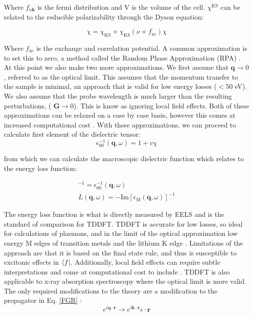 Where $f_{n\textbf{k}}$ is the fermi distribution and V is the volume of the cell.  $\chi^{\mathrm{KS}}$ can be related to the reducible polarizability through the Dyson equation:  

\begin{equation}
\chi = \chi_{\mathrm{KS}} + \chi_{\mathrm{KS}}(\nu + f_{\mathrm{xc}})\chi
\end{equation}

Where $f_{\mathrm{xc}}$ is the exchange and correlation potential.  A common approximation is to set this to zero, a method called the Random Phase Approximation (RPA) \cite{optic}.  At this point we also make two more approximations.  We first assume that $\textbf{q} \to 0$, referred to as the optical limit.  This assumes that the momentum transfer to the sample is minimal, an approach that is valid for low energy losses ($<$50 eV).  We also assume that the probe wavelength is much larger than the resulting perturbations, ($\textbf{ G} \to 0$). This is know as ignoring local field effects.  Both of these approximations can be relaxed on a case by case basis, however this comes at increased computational cost \cite{exciting}. With these approximations, we can proceed to calculate first element of the dielectric tensor: 
\begin{equation}
\epsilon_{\mathrm{00}}^{-1} (\textbf{q},\omega) =1+v \chi
\end{equation}

from which we can calculate the macroscopic dielectric function which relates to the energy loss function: 

\begin{gather}
[\epsilon_{\mathrm{M}}(\textbf{q},\omega)]^{-1} = \epsilon_{\mathrm{00}}^{-1}(\textbf{q},\omega)\\
	L(\textbf{q},\omega) = -\mathrm{Im}[\epsilon_{\mathrm{M}}(\textbf{q},\omega)]^{-1}
\end{gather}

The energy loss function is what is directly measured by EELS and is the standard of comparison for TDDFT. TDDFT is accurate for low losses, so ideal for calculations of plasmons, and in the limit of the optical approximation low energy M edges of transition metals and the lithium K edge \cite{mauchamp_local_2008}.  Limitations of the approach are that it is based on the final state rule, and thus is susceptible to excitonic effects in $\bra{f}$.  Additionally, local field effects can require subtle interpretations and come at computational cost to include \cite{mauchamp_local_2008}.    TDDFT is also applicable to x-ray absorption spectroscopy where the optical limit is more valid.  The only required modifications to the theory are a modification to the propagator in Eq. \ref{FGR} \cite{ankudinov_real-space_1998}:
\begin{equation}
e^{i\textbf{q}\cdot\textbf{r}} \to e^{i\textbf{k}\cdot\textbf{r}}\epsilon \cdot \textbf{r}
\label{x-prop}
\end{equation}

